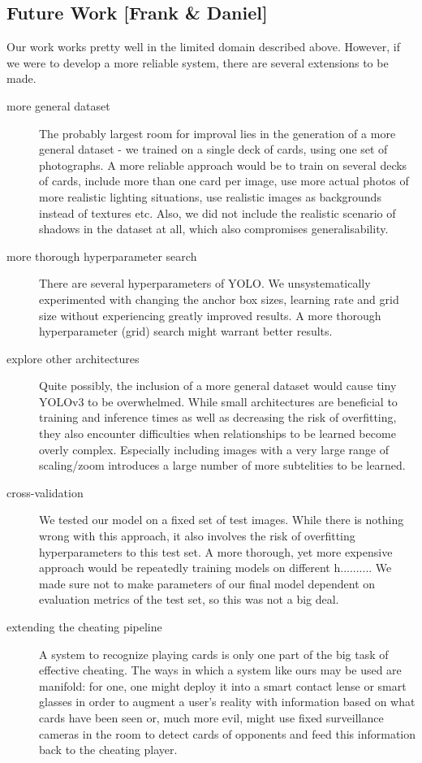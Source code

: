 \documentclass[a4paper]{article}
\begin{document}
\subsection*{Future Work [Frank \& Daniel]}
Our work works pretty well in the limited domain described above. However, if we were to develop a more reliable system, there are several extensions to be made.
\begin{description}
\item[more general dataset] The probably largest room for improval lies in the generation of a more general dataset - we trained on a single deck of cards, using one set of photographs. A more reliable approach would be to train on several decks of cards, include more than one card per image, use more actual photos of more realistic lighting situations, use realistic images as backgrounds instead of textures etc.
Also, we did not include the realistic scenario of shadows in the dataset at all, which also compromises generalisability.
\item[more thorough hyperparameter search] There are several hyperparameters of YOLO. We unsystematically experimented with changing the anchor box sizes, learning rate and grid size without experiencing greatly improved results. A more thorough hyperparameter (grid) search might warrant better results.

\item[explore other architectures] Quite possibly, the inclusion of a more general dataset would cause tiny YOLOv3 to be overwhelmed. While small architectures are beneficial to training and inference times as well as decreasing the risk of overfitting, they also encounter difficulties when relationships to be learned become overly complex. Especially including images with a very large range of scaling/zoom introduces a large number of more subtelities to be learned.
\item[cross-validation] We tested our model on a fixed set of test images. While there is nothing wrong with this approach, it also involves the risk of overfitting hyperparameters to this test set. A more thorough, yet more expensive approach would be repeatedly training models on different h.......... We made sure not to make parameters of our final model dependent on evaluation metrics of the test set, so this was not a big deal.
\item[extending the cheating pipeline] A system to recognize playing cards is only one part of the big task of effective cheating. The ways in which a system like ours may be used are manifold: for one, one might deploy it into a smart contact lense or smart glasses in order to augment a user's reality with information based on what cards have been seen or, much more evil, might use fixed surveillance cameras in the room to detect cards of opponents and feed this information back to the cheating player. 
\end{description}
\end{document}
